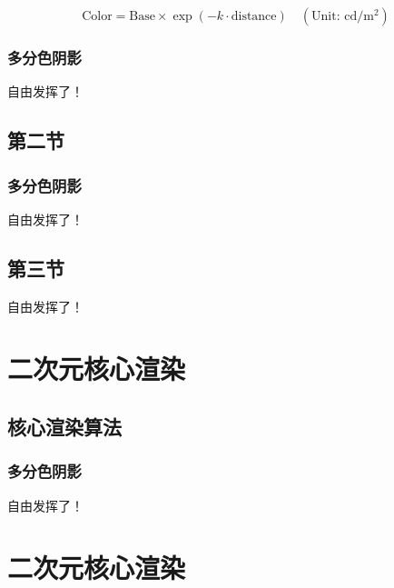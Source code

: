 \documentclass[twoside, 11pt, a4paper]{article}
\numberwithin{equation}{section} %
\begin{document}
\begin{equation}
    \text{Color} = \text{Base} \times \exp( -k \cdot \text{distance} ) \quad (\text{Unit: } \mathrm{cd/m^2})
\end{equation}


\subsubsection{多分色阴影}

{%
自由发挥了！
}

\subsection{第二节}

\subsubsection{多分色阴影}

{%
自由发挥了！
}

\subsection{第三节}
{%
自由发挥了！
}



\newpage

\section{二次元核心渲染}

\subsection{核心渲染算法}

\subsubsection{多分色阴影}

{%
自由发挥了！
}




\newpage

\section{二次元核心渲染}
\end{document}

